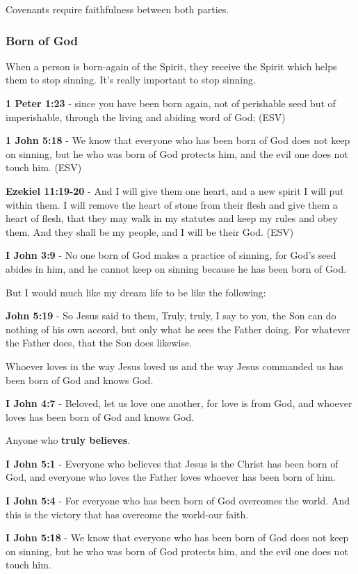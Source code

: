 \documentclass[11pt]{article}
\begin{document}
Covenants require faithfulness between both parties.

\subsubsection{Born of God}
\label{sec:org037f305}
When a person is born-again of the Spirit, they receive the Spirit which helps them to stop sinning. It's really important to stop sinning.

\textbf{1 Peter 1:23} -  since you have been born again, not of perishable seed but of imperishable, through the living and abiding word of God; (ESV)

\textbf{1 John 5:18} -  We know that everyone who has been born of God does not keep on sinning, but he who was born of God protects him, and the evil one does not touch him.  (ESV)

\textbf{Ezekiel 11:19-20} - And I will give them one heart, and a new spirit I will put within them. I will remove the heart of stone from their flesh and give them a heart of flesh, that they may walk in my statutes and keep my rules and obey them. And they shall be my people, and I will be their God. (ESV)

\textbf{I John 3:9} - No one born of God makes a practice of sinning, for God's seed abides in him, and he cannot keep on sinning because he has been born of God.

But I would much like my dream life to be like the following:

\textbf{John 5:19} - So Jesus said to them, Truly, truly, I say to you, the Son can do nothing of his own accord, but only what he sees the Father doing. For whatever the Father does, that the Son does likewise.

Whoever loves in the way Jesus loved us and the way Jesus commanded us has been born of God and knows God.

\textbf{I John 4:7} - Beloved, let us love one another, for love is from God, and whoever loves has been born of God and knows God.

Anyone who \textbf{truly believes}.

\textbf{I John 5:1} - Everyone who believes that Jesus is the Christ has been born of God, and everyone who loves the Father loves whoever has been born of him.

\textbf{I John 5:4} - For everyone who has been born of God overcomes the world. And this is the victory that has overcome the world-our faith.

\textbf{I John 5:18} - We know that everyone who has been born of God does not keep on sinning, but he who was born of God protects him, and the evil one does not touch him.
\end{document}
